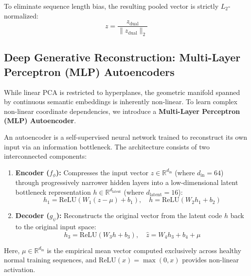 To eliminate sequence length bias, the resulting pooled vector is strictly $L_2$-normalized:
\begin{equation}
    z = \frac{z_{\text{dual}}}{\|z_{\text{dual}}\|_2}
\end{equation}

\subsection{Deep Generative Reconstruction: Multi-Layer Perceptron (MLP) Autoencoders}
\label{subsec:autoencoder_foundations}
While linear PCA is restricted to hyperplanes, the geometric manifold spanned by continuous semantic embeddings is inherently non-linear. To learn complex non-linear coordinate dependencies, we introduce a \textbf{Multi-Layer Perceptron (MLP) Autoencoder}.

An autoencoder is a self-supervised neural network trained to reconstruct its own input via an information bottleneck. The architecture consists of two interconnected components:
\begin{enumerate}
    \item \textbf{Encoder ($f_\phi$):} Compresses the input vector $z \in \mathbb{R}^{d_{\text{in}}}$ (where $d_{\text{in}}=64$) through progressively narrower hidden layers into a low-dimensional latent bottleneck representation $h \in \mathbb{R}^{d_{\text{latent}}}$ (where $d_{\text{latent}}=16$):
    \begin{equation}
        h_1 = \text{ReLU}(W_1 (z - \mu) + b_1), \quad h = \text{ReLU}(W_2 h_1 + b_2)
    \end{equation}
    \item \textbf{Decoder ($g_\psi$):} Reconstructs the original vector from the latent code $h$ back to the original input space:
    \begin{equation}
        h_3 = \text{ReLU}(W_3 h + b_3), \quad \hat{z} = W_4 h_3 + b_4 + \mu
    \end{equation}
\end{enumerate}
Here, $\mu \in \mathbb{R}^{d_{\text{in}}}$ is the empirical mean vector computed exclusively across healthy normal training sequences, and $\text{ReLU}(x) = \max(0, x)$ provides non-linear activation.

